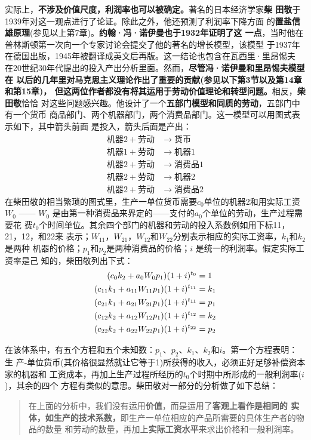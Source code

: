 实际上，\textbf{不涉及价值尺度，利润率也可以被确定。}著名的日本经济学家\textbf{柴
  田敬}于1939年对这一观点进行了论证。除此之外，他还预测了利润率下降方面
的\textbf{置盐信雄原理}(参见以上第7章)。\textbf{约翰·冯·诺伊曼也于1932年证明了这
  一点}，当时他在普林斯顿第一次向一个专家讨论会提交了他的著名的增长模型，该模型
于1937年在德国出版，1945年被翻译成英文后再版。这一结论也包含在瓦西里·里昂惕夫
在20世纪30年代提出的投入产出分析里面。然而，\textbf{尽管冯·诺伊曼和里昂惕夫模型在
  以后的几年里对马克思主义理论作出了重要的贡献(参见以下第3节以及第14章和第15章)，
  但这两位作者都没有将其运用于劳动价值理论和转型问题。}相反，\textbf{柴田敬}恰恰
对这些问题感兴趣。他设计了一个\textbf{五部门模型和同质的劳动}，五部门中有一个货币
商品部门、两个机器部门，两个消费品部门。这一模型可以用图式表示如下，其中箭头前面
是投入，箭头后面是产出：
\begin{align*}
机器2 + 劳动 &\to 货币 \\
机器1 + 劳动 &\to 机器1 \\
机器2 + 劳动 &\to 消费品1 \\
机器2 + 劳动 &\to 机器2 \\
机器2 + 劳动 &\to 消费品2
\end{align*}
在柴田敬的相当繁琐的图式里，生产一单位货币需要$c_0$单位的机器2和用实际工资$W_0$
—— $W_0$ 是由第一种消费品来界定的——支付的$a_0$个单位的劳动，生产过程需要花
费$t_0$个时间单位。其余四个部门的机器和劳动的投入系数例如用下标11，21，12，和22来
表示；$W_{11}，W_{21}，W_{12}和W_{22}$分别表示相应的实际工资率，$k_1和k_2$是两种
机器的价格；$p_1和p_2$是两种消费品的价格；$i$ 是统一的利润率。假定实际工资率是己
知的，柴田敬列出下式：
\begin{align}
(c_0k_2+a_0W_0p_1)(1+i)^{t_0} &=1 \notag \\
(c_{11}k_1+a_{11}W_{11}p_1)(1+i)^{t_{11}} &=k_1 \notag \\
(c_{21}k_1+a_{21}W_{21}p_1)(1+i)^{t_{11}} &=p_1 \notag \\
(c_{12}k_2+a_{12}W_{12}p_1)(1+i)^{t_{12}} &=k_2 \notag \\
(c_{22}k_2+a_{22}W_{22}p_1)(1+i)^{t_{22}} &=p_2
\end{align}

在该体系中，有五个方程和五个未知数：$p_1、p_2、k_1、k_2和i$。第一个方程表明：生
产-单位货币(其价格很显然就让它等于1)所获得的收入，必须正好足够补偿资本家的机器和
工资成本，再加上生产过程所经历的$t_0$个时期中所形成的一般利润率($i$)，其余的四个
方程有类似的意思。柴田敬对一部分的分析做了如下总结：

\begin{quotation}
  在上面的分析中，我们没有运用\textbf{价值}，而是运用了\textbf{客观上看作是相同的
    实体，如生产的技术系数，}即生产一单位相应的产品所需要的具体生产者的物品的数量
  和劳动的数量，再加上\textbf{实际工资水平}来求出价格和一般利润率。
\end{quotation}

